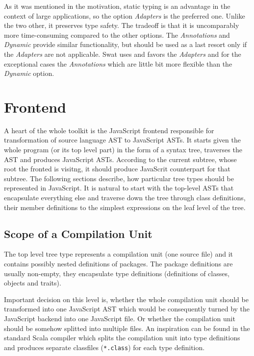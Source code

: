 \documentclass[12pt,a4paper]{report}
\begin{document}
As it was mentioned in the motivation, static typing is an advantage in the context of large applications, so the option {\it Adapters} is the preferred one. Unlike the two other, it preserves type safety. The tradeoff is that it is uncomparably more time-consuming compared to the other options. The {\it Annotations} and {\it Dynamic} provide similar functionality, but should be used as a last resort only if the {\it Adapters} are not applicable. Swat uses and favors the {\it Adapters} and for the exceptional cases the {\it Annotations} which are little bit more flexible than the {\it Dynamic} option.

\section{Frontend}

A heart of the whole toolkit is the JavaScript frontend responsible for transformation of source language AST to JavaScript ASTs. It starts given the whole program (or its top level part) in the form of a syntax tree, traverses the AST and produces JavaScript ASTs. According to the current subtree, whose root the fronted is  visitng, it should produce JavaScrit counterpart for that subtree. The following sections describe, how particular tree types should be represented in JavaScript. It is natural to start with the top-level ASTs that encapsulate everything else and traverse down the tree through class definitions, their member definitions to the simplest expressions on the leaf level of the tree.

\subsection{Scope of a Compilation Unit}

The top level tree type represents a compilation unit (one source file) and it contains possibly nested definitions of packages. The package definitions are usually non-empty, they encapsulate type definitions (definitions of classes, objects and traits).

Important decision on this level is, whether the whole compilation unit should be transformed into one JavaScript AST which would be consequently turned by the JavaScript backend into one JavaScript file. Or whether the compilation unit should be somehow splitted into multiple files. An inspiration can be found in the standard Scala compiler which splits the compilation unit into type definitions and produces separate classfiles (\texttt{*.class}) for each type definition.
\end{document}
